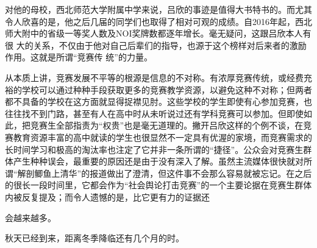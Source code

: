 \documentclass{article}
\begin{document}
对他的母校，西北师范⼤学附属中学来说，吕欣的事迹是值得⼤书特书的。⽽尤其令⼈欣喜的是，他之后⼏届的同学们也取得了相对可观的成绩。⾃2016年起，西北师⼤附中的省级⼀等奖⼈数及NOI奖牌数都逐年增长。毫⽆疑问，这跟吕欣本⼈有很
\newpage
⼤的关系，不仅由于他对⾃⼰后辈们的指导，也源于这个榜样对后来者的激励作⽤。这就是所谓“竞赛传
统”的⼒量。 

从本质上讲，竞赛发展不平等的根源是信息的不对称。有浓厚竞赛传统，或经费充裕的学校可以通过种种⼿段获取更多的竞赛教学资源，以避免这种不对称；但两者都不具备的学校在这⽅⾯就显得捉襟见肘。这些学校的学⽣即使有⼼参加竞赛，也往往找不到门路，甚⾄有⼈在⾼中时从未听说过还有学科竞赛可以参加。但即使如此，把竞赛⽣全部指责为“权贵”也是毫⽆道理的。撇开吕欣这样的个例不谈，在竞赛教育资源丰富的⾼中就读的学⽣也很显然不⼀定具有优渥的家境，⽽竞赛需求的长时间学习和极⾼的淘汰率也注定了它并⾮⼀条所谓的“捷径”。公众会对竞赛⽣群体产⽣种种误会，最重要的原因还是由于没有深⼊了解。虽然主流媒体很快就对所谓“解剖鲫鱼上清华”的报道做出了澄清，但这件事不会那么容易就被忘记。在之后的很长⼀段时间⾥，它都会作为“社会舆论打击竞赛”的⼀个主要论据在竞赛⽣群体内被反复提及；⽽令⼈遗憾的是，⽐它更有⼒的证据还
\newpage

会越来越多。 

秋天已经到来，距离冬季降临还有⼏个⽉的时。
\end{document}
